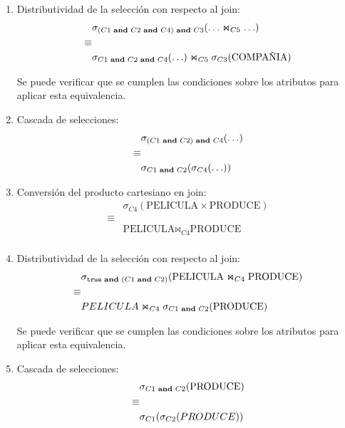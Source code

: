 \documentclass[10pt]{article}
\begin{document}
\begin{enumerate}
\begin{enumerate}
\item Distributividad de la selección con respecto al join:
       \begin{eqnarray*}
       & \sigma_{(C1 \text{ {\bf and} } C2 \text{ {\bf and} } C4) \text{ {\bf and} } C3}(\ldots \Join_{C5} \ldots)  \\
       \equiv & \\
       & \sigma_{C1 \text{ {\bf and} } C2 \text{ {\bf and} } C4}(\ldots) \Join_{C5} \sigma_{C3}(\text{COMPAÑIA})  \\
       \end{eqnarray*}

       Se puede verificar que se cumplen las condiciones sobre los atributos
       para aplicar esta equivalencia.

 \item Cascada de selecciones:
       \begin{eqnarray*}
       & \sigma_{(C1 \text{ {\bf and} } C2) \text{ {\bf and} } C4}(\ldots) \\
       \equiv & \\
       & \sigma_{C1 \text{ {\bf and} } C2}(\sigma_{C4}(\ldots))
       \end{eqnarray*}

 \item Conversión del producto cartesiano en join:
       \begin{eqnarray*}
       & \sigma_{C4}(\text{PELICULA} \times \text{PRODUCE}) \\
       \equiv & \\
       & \text{PELICULA} \Join_{C4} \text{PRODUCE} \\
       \end{eqnarray*}

\item Distributividad de la selección con respecto al join:
       \begin{eqnarray*}
       & \sigma_{\mathtt{true} \text{ {\bf and} } (C1 \text{ {\bf and} } C2)}(\text{PELICULA} \Join_{C4} \text{PRODUCE})  \\
       \equiv & \\
       & PELICULA \Join_{C4} \sigma_{C1 \text{ {\bf and} } C2}(\text{PRODUCE})  \\
       \end{eqnarray*}

       Se puede verificar que se cumplen las condiciones sobre los atributos
       para aplicar esta equivalencia.

 \item Cascada de selecciones:
       \begin{eqnarray*}
       & \sigma_{C1 \text{ {\bf and} } C2}(\text{PRODUCE}) \\
       \equiv & \\
       & \sigma_{C1}(\sigma_{C2}(PRODUCE))
       \end{eqnarray*}


\end{enumerate}
\end{enumerate}
\end{document}

